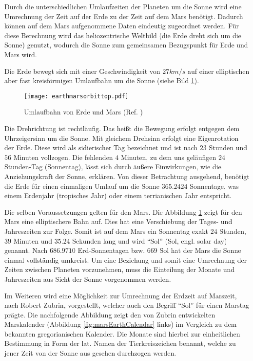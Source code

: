 Durch die unterschiedlichen Umlaufzeiten der Planeten um die Sonne wird eine
Umrechnung der Zeit auf der Erde zu der Zeit auf dem Mars ben{\"o}tigt.
Dadurch k{\"o}nnen auf dem Mars aufgenommene Daten eindeutig zugeordnet
werden.
F{\"u}r diese Berechnung wird das heliozentrische Weltbild (die Erde dreht sich
um die Sonne) genutzt, wodurch die Sonne zum gemeinsamen Bezugspunkt f{\"u}r
Erde und Mars wird.

Die Erde bewegt sich mit einer Geschwindigkeit von $27 km/s$ auf einer
elliptischen aber fast kreisf{\"o}rmigen Umlaufbahn um die Sonne (siehe Bild
\ref{fig:marsEarthOrbit}).

\begin{figure}[H]
	\centering
	\texttt{[image: earthmarsorbittop.pdf]}
	\label{fig:marsEarthOrbit}
	\caption{Umlaufbahn von Erde und Mars (Ref. \cite{img1})}
\end{figure}

Die Drehrichtung ist rechtl{\"a}ufig. Das hei{\ss}t die Bewegung erfolgt
entgegen dem Uhrzeigersinn um die Sonne. Mit gleichem Drehsinn erfolgt eine Eigenrotation
der Erde. Diese wird als sidierischer Tag bezeichnet und ist nach $23$ Stunden
und $56$ Minuten vollzogen. Die fehlenden $4$ Minuten, zu dem uns gel{\"a}ufigen
$24$ Stunden-Tag (Sonnentag), l{\"a}sst sich durch {\"a}u{\ss}ere Einwirkungen,
wie die Anziehungskraft der Sonne, erkl{\"a}ren. Von dieser Betrachtung
ausgehend, ben{\"o}tigt die Erde f{\"u}r einen einmaligen Umlauf um die Sonne
$365.2424$ Sonnentage, was einem Erdenjahr (tropisches Jahr) oder einem
terrianischen Jahr entspricht.

Die selben Voraussetzungen gelten f{\"u}r den Mars. Die Abbildung
\ref{fig:marsEarthOrbit} zeigt f{\"u}r den Mars eine elliptischere Bahn
auf. Dies hat eine Verschiebung der Tages- und Jahreszeiten zur Folge. Somit ist
auf dem Mars ein Sonnentag exakt $24$ Stunden, $39$ Minuten und $35.24$ Sekunden lang und
wird "`Sol"' (Sol, engl. solar day) genannt. Nach $686.9710$ Erd-Sonnentagen
bzw. $669$ Sol hat der Mars die Sonne einmal vollst{\"a}ndig umkreist. Um eine Beziehung
und somit eine Umrechnung der Zeiten zwischen Planeten vorzunehmen, muss die
Einteilung der Monate und Jahreszeiten aus Sicht der Sonne vorgenommen werden.

Im Weiteren wird eine M{\"o}glichkeit zur Umrechnung der Erdzeit auf Marszeit,
nach Robert Zubrin, vorgestellt, welcher auch den Begriff "`Sol"'
f{\"u}r einen Marstag pr{\"a}gte. Die nachfolgende Abbildung zeigt den von Zubrin entwickelten
Marskalender (Abbildung \ref{fig:marsEarthCalendar} links) im Vergleich zu dem
bekannten gregorianischen Kalender. Die Monate sind hierbei zur einheitlichen
Bestimmung in Form der lat. Namen der Tierkreiszeichen benannt, welche zu jener
Zeit von der Sonne aus gesehen durchzogen werden.

